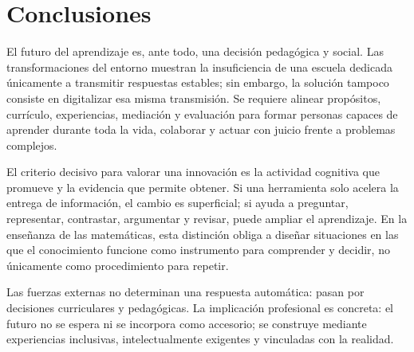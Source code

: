 \documentclass[spanish,letterpaper,oneside]{article}
\begin{document}
\section{Conclusiones}

El futuro del aprendizaje es, ante todo, una decisión pedagógica y social. Las transformaciones del entorno muestran la insuficiencia de una escuela dedicada únicamente a transmitir respuestas estables; sin embargo, la solución tampoco consiste en digitalizar esa misma transmisión. Se requiere alinear propósitos, currículo, experiencias, mediación y evaluación para formar personas capaces de aprender durante toda la vida, colaborar y actuar con juicio frente a problemas complejos.

El criterio decisivo para valorar una innovación es la actividad cognitiva que promueve y la evidencia que permite obtener. Si una herramienta solo acelera la entrega de información, el cambio es superficial; si ayuda a preguntar, representar, contrastar, argumentar y revisar, puede ampliar el aprendizaje. En la enseñanza de las matemáticas, esta distinción obliga a diseñar situaciones en las que el conocimiento funcione como instrumento para comprender y decidir, no únicamente como procedimiento para repetir.

Las fuerzas externas no determinan una respuesta automática: pasan por decisiones curriculares y pedagógicas. La implicación profesional es concreta: el futuro no se espera ni se incorpora como accesorio; se construye mediante experiencias inclusivas, intelectualmente exigentes y vinculadas con la realidad.


\end{document}

